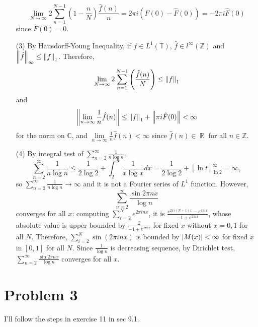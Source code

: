 \documentclass{article}
\DeclareMathOperator{\rr}{\mathbb{R}}
\begin{document}
\begin{enumerate}
\begin{equation*}
\lim\limits_{N\rightarrow\infty}2\sum\limits_{n=1}^{N-1}\left(1-\frac{n}{N}\right)\frac{\hat{f}(n)}{n}=2\pi i(F(0)-\hat{F}(0))=-2\pi i \hat{F}(0)
\end{equation*}
since $F(0)=0$.
\item[(3)] By Hausdorff-Young Inequality, if $f\in L^1(\mathbb{T})$, $ \hat{f}\in l^\infty(\mathbb{Z})$ and $\norm{\hat{f}}_\infty\leq \norm{f}_1$. Therefore, 
\begin{equation*}
\lim\limits_{N\rightarrow\infty}2\sum\limits_{n=1}^{N-1}\left(\frac{\hat{f}(n)}{N}\right)\leq \norm{f}_1
\end{equation*}
and
\begin{equation*}
\norm{\lim\limits_{n\rightarrow \infty} \frac{1}{n}\hat{f}(n)}\leq \norm{f}_1+\norm{\pi i \hat{F}(0)}<\infty
\end{equation*}
for the norm on $\mathbb{C}$, and $\lim\limits_{n\rightarrow\infty} \frac{1}{n}\hat{f}(n)< \infty$ since $\hat{f}(n)\in \rr$ for all $n\in \mathbb{Z}$.
\item[(4)] By integral test of $\sum\limits_{n=2}^\infty \frac{1}{n\log n}$,
\begin{equation*}
\sum\limits_{n=2}^\infty \frac{1}{n\log n}\leq \frac{1}{2\log 2}+ \int_2^\infty \frac{1}{x\log x}dx=\frac{1}{2\log 2}+ \left[\ln t\right]_{\ln 2}^\infty = \infty, 
\end{equation*} 
so $\sum\limits_{n=2}^\infty \frac{1}{n\log n}\rightarrow \infty$ and it is not a Fourier series of $L^1$ function. However,
\begin{equation*}
\sum\limits_{n=2}^\infty \frac{\sin 2\pi n x}{\log n}
\end{equation*}
converges for all $x$: computing $\sum\limits_{i=2}^N e^{2\pi i n x}$, it is $ \frac{e^{2\pi i (N+1)x}-e^{4\pi i x}}{-1+e^{2\pi i x}}$, whose absolute value is upper bounded by $\frac{2}{-1+e^{2\pi i x}}$ for fixed $x$ without $x=0,1$ for all $N$. Therefore, $\sum\limits_{i=2}^N \sin(2\pi i n x)$ is bounded by $\abs{M(x)}<\infty$ for fixed $x$ in $[0, 1]$ for all $N$. Since $\frac{1}{\log n}$ is decreasing sequence, by Dirichlet test, $\sum\limits_{n=2}^\infty \frac{\sin 2\pi n x}{\log n}$ converges for all $x$.
\end{enumerate}
\section*{Problem 3}
I'll follow the steps in exercise 11 in sec 9.1.
\end{document}
